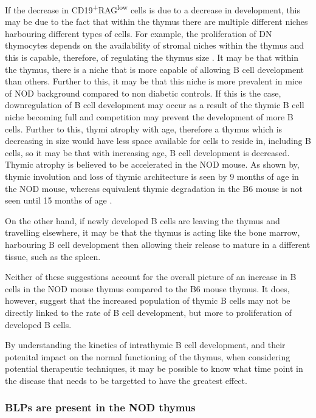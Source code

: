 If the decrease in CD19\textsuperscript{+}RAG\textsuperscript{low} cells is due to a decrease in development, this may be due to the fact that within the thymus there are multiple different niches harbouring different types of cells.
For example, the proliferation of DN thymocytes depends on the availability of stromal niches within the thymus and this is capable, therefore, of regulating the thymus size \citep{Prockop2004}.
It may be that within the thymus, there is a niche that is more capable of allowing B cell development than others.
Further to this, it may be that this niche is more prevalent in mice of NOD background compared to non diabetic controls.
If this is the case, downregulation of B cell development may occur as a result of the thymic B cell niche becoming full and competition may prevent the development of more B cells.
Further to this, thymi atrophy with age, therefore a thymus which is decreasing in size would have less space available for cells to reside in, including B cells, so it may be that with increasing age, B cell development is decreased.
Thymic atrophy is believed to be accelerated in the NOD mouse.
As shown by, thymic involution and loss of thymic architecture is seen by 9 months of age in the NOD mouse, whereas equivalent thymic degradation in the B6 mouse is not seen until 15 months of age \citep{Ferreira2014}.

On the other hand, if newly developed B cells are leaving the thymus and travelling elsewhere, it may be that the thymus is acting like the bone marrow, harbouring B cell development then allowing their release to mature in a different tissue, such as the spleen.

Neither of these suggestions account for the overall picture of an increase in B cells in the NOD mouse thymus compared to the B6 mouse thymus.
It does, however, suggest that the increased population of thymic B cells may not be directly linked to the rate of B cell development, but more to proliferation of developed B cells.

By understanding the kinetics of intrathymic B cell development, and their potenital impact on the normal functioning of the thymus, when considering potential therapeutic techniques, it may be possible to know what time point in the disease that needs to be targetted to have the greatest effect.

\subsubsection{BLPs are present in the NOD thymus}


